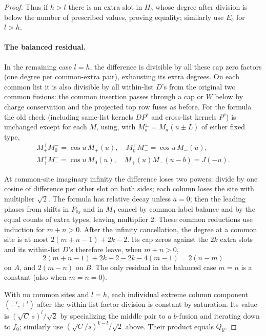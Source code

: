 \begin{proof}
Thus if \(h>l\) there is an extra slot in \(H_b\) whose degree after division is below the number of prescribed values, proving equality; similarly use \(E_b\) for \(l>h\).

\paragraph{The balanced residual.}
In the remaining case \(l=h\), the difference is divisible by all these cap zero factors (one degree per common-extra pair), exhausting its extra degrees. On each common list it is also divisible by all within-list \(D\)'s from the original two common fusions: the common insertion passes through a cap or \(W\) below by charge conservation and the projected top row fuses as before. For the formula the old check (including same-list kernels \(D P^s\) and cross-list kernels \(P^c\)) is unchanged except for each \(M\), using, with \(M_a^\pm=M_a(u\pm L)\) of either fixed type,
\[
 \begin{gathered}
 M_+^+M_0^-=\cos u\,M_+(u),\quad M_0^+M_-^-=\cos u\,M_-(u),\\
 M_+^+M_-^-=\cos u\,M_0(u),\quad M_+(u)M_-(u-b)=J(-u).
 \end{gathered}
\]

At common-site imaginary infinity the difference loses two powers: divide by one cosine of difference per other slot on both sides; each column loses the site with multiplier \(\sqrt2\). The formula has relative decay unless \(a=0\); then the leading phases from shifts in \(P_{0j}\) and in \(M_0\) cancel by common-label balance and by the equal counts of extra types, leaving multiplier 2. These common reductions use induction for \(m+n>0\). After the infinity cancellation, the degree at a common site is at most \(2(m+n-1)+2k-2\). Its cap zeros against the \(2k\) extra slots and its within-list \(D\)'s therefore leave, when \(m+n>0\),
\[
 2(m+n-1)+2k-2-2k-4(m-1)=2(n-m)
\]
on \(A\), and \(2(m-n)\) on \(B\). The only residual in the balanced case \(m=n\) is a constant (also when \(m=n=0\)).

With no common sites and \(l=h\), each individual extreme column component \((-^l,+^l)\) after the within-list factor division is constant by saturation. Its value is \((\sqrt C\,s)^l/\sqrt2\) by specializing the middle pair to a \(b\)-fusion and iterating down to \(f_0\); similarly use \((\sqrt C/s)^{k-l}/\sqrt2\) above. Their product equals \(Q_{ll}\).


\end{proof}
